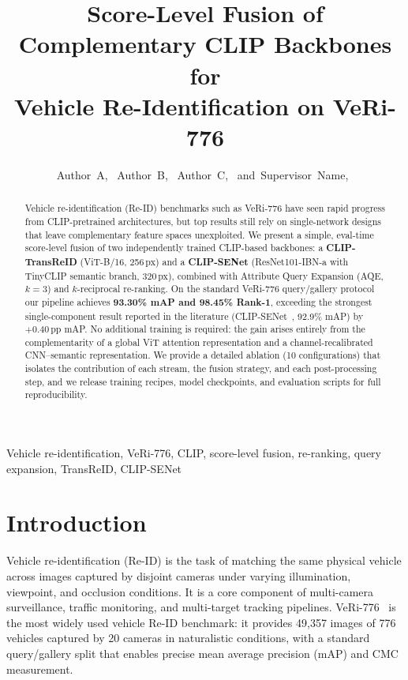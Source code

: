 \documentclass{ieeeaccess}
\title{Score-Level Fusion of Complementary CLIP Backbones for\\
       Vehicle Re-Identification on VeRi-776}
\author{%
  Author~A,~\IEEEmembership{}
  Author~B,~\IEEEmembership{}
  Author~C,~\IEEEmembership{}
  and~Supervisor~Name,~\IEEEmembership{Senior~Member,~IEEE}%
}
\newcommand{\ourmap}{93.30}
\newcommand{\ourrank}{98.45}
\newcommand{\cspaper}{92.9}  %
\newcommand{\aqek}{3}
\begin{document}
\maketitle

\begin{abstract}
Vehicle re-identification (Re-ID) benchmarks such as VeRi-776 have seen rapid
progress from CLIP-pretrained architectures, but top results still rely on
single-network designs that leave complementary feature spaces unexploited.
We present a simple, eval-time score-level fusion of two independently
trained CLIP-based backbones: a \textbf{CLIP-TransReID} (ViT-B/16, 256\,px)
and a \textbf{CLIP-SENet} (ResNet101-IBN-a with TinyCLIP semantic branch,
320\,px), combined with Attribute Query Expansion
(AQE, $k{=}\aqek$) and $k$-reciprocal re-ranking.
On the standard VeRi-776 query/gallery protocol our pipeline achieves
\textbf{\ourmap\% mAP and \ourrank\% Rank-1}, exceeding the
strongest single-component result reported in the literature
(CLIP-SENet~\cite{clipsenet}, \cspaper\% mAP) by $+0.40$\,pp mAP.
No additional training is required: the gain arises entirely from the
complementarity of a global ViT attention representation
and a channel-recalibrated CNN–semantic representation.
We provide a detailed ablation (10 configurations) that isolates the
contribution of each stream, the fusion strategy, and each post-processing
step, and we release training recipes, model checkpoints, and
evaluation scripts for full reproducibility.
\end{abstract}

\begin{IEEEkeywords}
Vehicle re-identification, VeRi-776, CLIP, score-level fusion, re-ranking,
query expansion, TransReID, CLIP-SENet
\end{IEEEkeywords}

\section{Introduction}
\label{sec:intro}

Vehicle re-identification (Re-ID) is the task of matching the same physical
vehicle across images captured by disjoint cameras under varying illumination,
viewpoint, and occlusion conditions. It is a core component of multi-camera
surveillance, traffic monitoring, and multi-target tracking pipelines.
VeRi-776~\cite{veri776} is the most widely used vehicle Re-ID benchmark:
it provides 49{,}357 images of 776 vehicles captured by 20 cameras in
naturalistic conditions, with a standard query/gallery split that enables
precise mean average precision (mAP) and CMC measurement.
\end{document}

